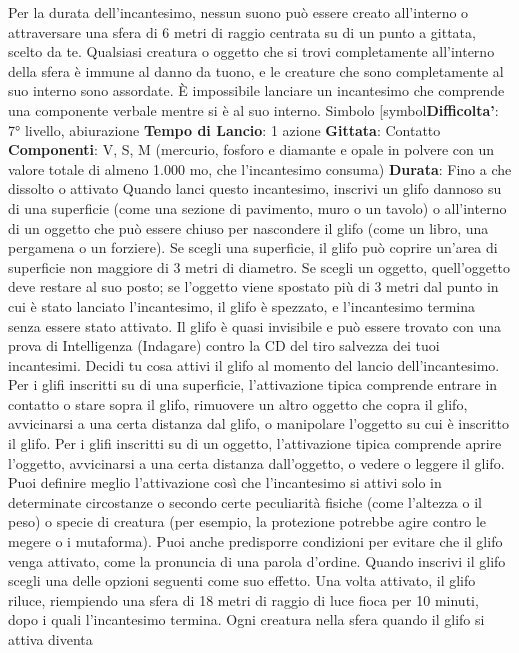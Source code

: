 \begin{multicols}{2}
Per la durata dell’incantesimo, nessun suono può
essere creato all’interno o attraversare una sfera di 6
metri di raggio centrata su di un punto a gittata, scelto
da te. Qualsiasi creatura o oggetto che si trovi
completamente all’interno della sfera è immune al
danno da tuono, e le creature che sono completamente
al suo interno sono assordate. È impossibile lanciare un
incantesimo che comprende una componente verbale
mentre si è al suo interno.
Simbolo
[symbol\textbf{Difficolta'}:
7° livello, abiurazione
\textbf{Tempo di Lancio}: 1 azione
\textbf{Gittata}: Contatto
\textbf{Componenti}: V, S, M (mercurio, fosforo e diamante e
opale in polvere con un valore totale di almeno 1.000
mo, che l’incantesimo consuma)
\textbf{Durata}: Fino a che dissolto o attivato
Quando lanci questo incantesimo, inscrivi un glifo
dannoso su di una superficie (come una sezione di
pavimento, muro o un tavolo) o all’interno di un oggetto
che può essere chiuso per nascondere il glifo (come un
libro, una pergamena o un forziere). Se scegli una
superficie, il glifo può coprire un’area di superficie non
maggiore di 3 metri di diametro. Se scegli un oggetto,
quell’oggetto deve restare al suo posto; se l’oggetto 
viene spostato più di 3 metri dal punto in cui è stato
lanciato l’incantesimo, il glifo è spezzato, e
l’incantesimo termina senza essere stato attivato.
Il glifo è quasi invisibile e può essere trovato con una
prova di Intelligenza (Indagare) contro la CD del tiro
salvezza dei tuoi incantesimi.
Decidi tu cosa attivi il glifo al momento del lancio
dell’incantesimo.
Per i glifi inscritti su di una superficie, l’attivazione tipica
comprende entrare in contatto o stare sopra il glifo,
rimuovere un altro oggetto che copra il glifo, avvicinarsi
a una certa distanza dal glifo, o manipolare l’oggetto su
cui è inscritto il glifo.
Per i glifi inscritti su di un oggetto, l’attivazione tipica
comprende aprire l’oggetto, avvicinarsi a una certa
distanza dall’oggetto, o vedere o leggere il glifo.
Puoi definire meglio l’attivazione così che l’incantesimo
si attivi solo in determinate circostanze o secondo certe
peculiarità fisiche (come l’altezza o il peso) o specie di
creatura (per esempio, la protezione potrebbe agire
contro le megere o i mutaforma). Puoi anche
predisporre condizioni per evitare che il glifo venga
attivato, come la pronuncia di una parola d’ordine.
Quando inscrivi il glifo scegli una delle opzioni seguenti
come suo effetto. Una volta attivato, il glifo riluce,
riempiendo una sfera di 18 metri di raggio di luce fioca
per 10 minuti, dopo i quali l’incantesimo termina. Ogni
creatura nella sfera quando il glifo si attiva diventa

\end{multicols}
